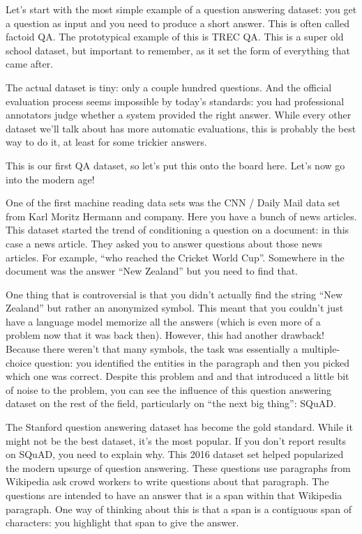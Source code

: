 Let’s start with the most simple example of a question answering dataset: you get a question as input and you need to produce a short answer.  This is often called factoid QA.  The prototypical example of this is TREC QA.  This is a super old school dataset, but important to remember, as it set the form of everything that came after.

The actual dataset is tiny: only a couple hundred questions.  And the official evaluation process seems impossible by today’s standards: you had professional annotators judge whether a system provided the right answer.  While every other dataset we’ll talk about has more automatic evaluations, this is probably the best way to do it, at least for some trickier answers.

This is our first QA dataset, so let’s put this onto the board here.  Let’s now go into the modern age!

One of the first machine reading data sets was the CNN / Daily Mail data set from Karl Moritz Hermann and company.  Here you have a bunch of news articles.  This dataset started the trend of conditioning a question on a document: in this case a news article.  They asked you to answer questions about those news articles.  For example, “who reached the Cricket World Cup”.  Somewhere in the document was the answer “New Zealand” but you need to find that.

One thing that is controversial is that you didn’t actually find the string “New Zealand” but rather an anonymized symbol.  This meant that you couldn’t just have a language model memorize all the answers (which is even more of a problem now that it was back then).  However, this had another drawback!  Because there weren’t that many symbols, the task was essentially a multiple-choice question: you identified the entities in the paragraph and then you picked which one was correct.  Despite this problem and and that introduced a little bit of noise to the problem, you can see the influence of this question answering dataset on the rest of the field, particularly on “the next big thing”: SQuAD.

The Stanford question answering dataset has become the gold standard.  While it might not be the best dataset, it’s the most popular.  If you don't report results on SQuAD, you need to explain why.  This 2016 dataset set helped popularized the modern upsurge of question answering.  These questions use paragraphs from Wikipedia ask crowd workers to write questions about that paragraph.  The questions are intended to have an answer that is a span within that Wikipedia paragraph.  One way of thinking about this is that a span is a contiguous span of characters: you highlight that span to give the answer.

